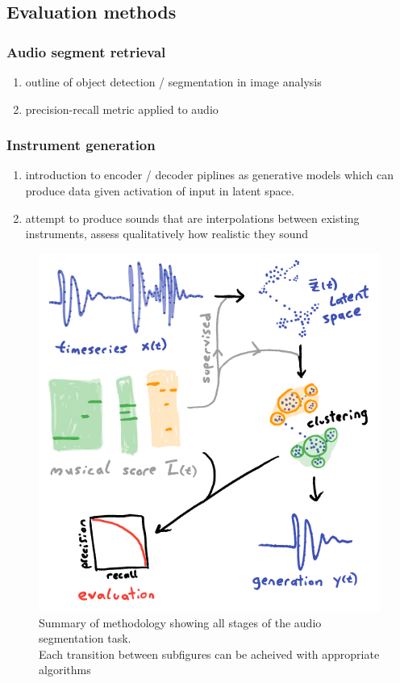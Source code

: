 \documentclass{article}[12pt]
\numberwithin{equation}{section}
\begin{document}
\subsection{Evaluation methods}
\subsubsection{Audio segment retrieval}
\begin{enumerate}
	\item outline of object detection / segmentation in image analysis
	\item precision-recall metric applied to audio
\end{enumerate}
\subsubsection{Instrument generation}
\begin{enumerate}
	\item introduction to encoder / decoder piplines as generative models which
	can produce data given activation of input in latent space.
	\item attempt to produce sounds that are interpolations between
	existing instruments, assess qualitatively how realistic they sound
\end{enumerate}


\begin{figure}[H]
\centering{}
\captionsetup{justification=centering}
\includegraphics[scale=0.5]{methods}
\caption{Summary of methodology showing all stages of the audio segmentation task.\\
Each transition between subfigures can be acheived with appropriate algorithms
}
\label{fig:methods}
\end{figure}
\end{document}
